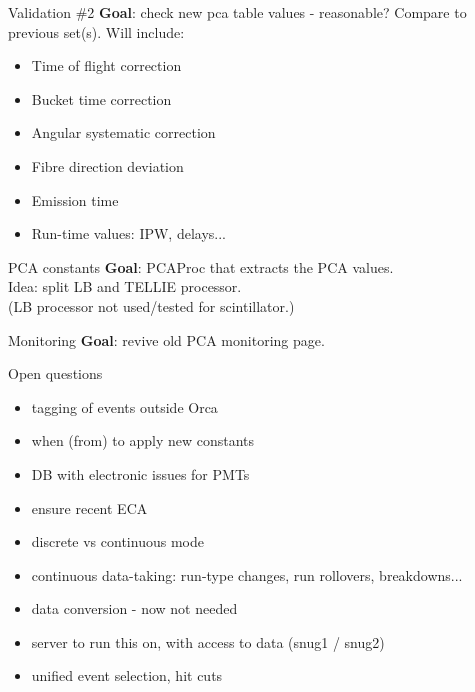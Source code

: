 \documentclass[xcolor=table]{beamer}
\begin{document}
\begin{frame}{Validation \#2}
\textbf{Goal}: check new pca table values - reasonable? Compare to previous set(s).
Will include:
\begin{itemize}
	\item Time of flight correction
	\item Bucket time correction
	\item Angular systematic correction
	\item Fibre direction deviation
	\item Emission time
	\item Run-time values: IPW, delays...
\end{itemize}
\end{frame}

\begin{frame}{PCA constants}
\textbf{Goal}: PCAProc that extracts the PCA values. \\
Idea: split LB and TELLIE processor. \\
(LB processor not used/tested for scintillator.)
\end{frame}

\begin{frame}{Monitoring}
\textbf{Goal}: revive old PCA monitoring page.
\noindent{}
\end{frame}

\begin{frame}{Open questions}
\begin{itemize}
	\item tagging of events outside Orca
	\item when (from) to apply new constants
	\item DB with electronic issues for PMTs
	\item ensure recent ECA
	\item discrete vs continuous mode
	\item continuous data-taking: run-type changes, run rollovers, breakdowns...
	\item data conversion - now not needed
	\item server to run this on, with access to data (snug1 / snug2)
	\item unified event selection, hit cuts
\end{itemize}
\end{frame}
\end{document}
